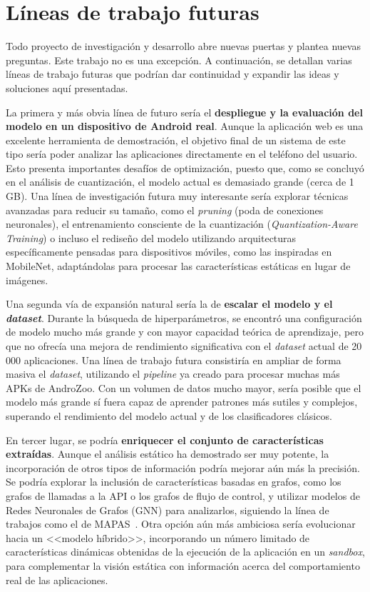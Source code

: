 \section{Líneas de trabajo futuras}

Todo proyecto de investigación y desarrollo abre nuevas puertas y plantea nuevas preguntas. Este trabajo no es una excepción. A continuación, se detallan varias líneas de trabajo futuras que podrían dar continuidad y expandir las ideas y soluciones aquí presentadas.

La primera y más obvia línea de futuro sería el \textbf{despliegue y la evaluación del modelo en un dispositivo de Android real}. Aunque la aplicación web es una excelente herramienta de demostración, el objetivo final de un sistema de este tipo sería poder analizar las aplicaciones directamente en el teléfono del usuario. Esto presenta importantes desafíos de optimización, puesto que, como se concluyó en el análisis de cuantización, el modelo actual es demasiado grande (cerca de 1 GB). Una línea de investigación futura muy interesante sería explorar técnicas avanzadas para reducir su tamaño, como el \textit{pruning} (poda de conexiones neuronales), el entrenamiento consciente de la cuantización (\textit{Quantization-Aware Training}) o incluso el rediseño del modelo utilizando arquitecturas específicamente pensadas para dispositivos móviles, como las inspiradas en MobileNet, adaptándolas para procesar las características estáticas en lugar de imágenes.

Una segunda vía de expansión natural sería la de \textbf{escalar el modelo y el \textit{dataset}}. Durante la búsqueda de hiperparámetros, se encontró una configuración de modelo mucho más grande y con mayor capacidad teórica de aprendizaje, pero que no ofrecía una mejora de rendimiento significativa con el \textit{dataset} actual de 20\,000 aplicaciones. Una línea de trabajo futura consistiría en ampliar de forma masiva el \textit{dataset}, utilizando el \textit{pipeline} ya creado para procesar muchas más APKs de AndroZoo. Con un volumen de datos mucho mayor, sería posible que el modelo más grande sí fuera capaz de aprender patrones más sutiles y complejos, superando el rendimiento del modelo actual y de los clasificadores clásicos.

En tercer lugar, se podría \textbf{enriquecer el conjunto de características extraídas}. Aunque el análisis estático ha demostrado ser muy potente, la incorporación de otros tipos de información podría mejorar aún más la precisión. Se podría explorar la inclusión de características basadas en grafos, como los grafos de llamadas a la API o los grafos de flujo de control, y utilizar modelos de Redes Neuronales de Grafos (GNN) para analizarlos, siguiendo la línea de trabajos como el de MAPAS~\cite{kim2022mapas}. Otra opción aún más ambiciosa sería evolucionar hacia un <<modelo híbrido>>, incorporando un número limitado de características dinámicas obtenidas de la ejecución de la aplicación en un \textit{sandbox}, para complementar la visión estática con información acerca del comportamiento real de las aplicaciones.

